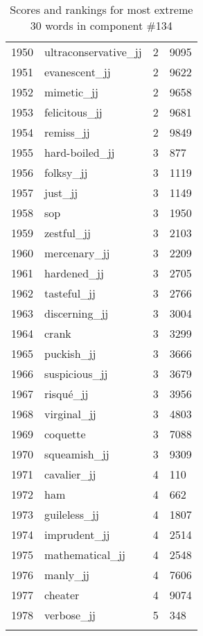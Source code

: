 \begin{longtable}[!htbp]{| rlr@{.}l |}
    1950 & ultraconservative\_jj & 2 & 9095 \\
    1951 & evanescent\_jj & 2 & 9622 \\
    1952 & mimetic\_jj & 2 & 9658 \\
    1953 & felicitous\_jj & 2 & 9681 \\
    1954 & remiss\_jj & 2 & 9849 \\
    1955 & hard-boiled\_jj & 3 & 877 \\
    1956 & folksy\_jj & 3 & 1119 \\
    1957 & just\_jj & 3 & 1149 \\
    1958 & sop & 3 & 1950 \\
    1959 & zestful\_jj & 3 & 2103 \\
    1960 & mercenary\_jj & 3 & 2209 \\
    1961 & hardened\_jj & 3 & 2705 \\
    1962 & tasteful\_jj & 3 & 2766 \\
    1963 & discerning\_jj & 3 & 3004 \\
    1964 & crank & 3 & 3299 \\
    1965 & puckish\_jj & 3 & 3666 \\
    1966 & suspicious\_jj & 3 & 3679 \\
    1967 & risqué\_jj & 3 & 3956 \\
    1968 & virginal\_jj & 3 & 4803 \\
    1969 & coquette & 3 & 7088 \\
    1970 & squeamish\_jj & 3 & 9309 \\
    1971 & cavalier\_jj & 4 & 110 \\
    1972 & ham & 4 & 662 \\
    1973 & guileless\_jj & 4 & 1807 \\
    1974 & imprudent\_jj & 4 & 2514 \\
    1975 & mathematical\_jj & 4 & 2548 \\
    1976 & manly\_jj & 4 & 7606 \\
    1977 & cheater & 4 & 9074 \\
    1978 & verbose\_jj & 5 & 348 \\
    \hline
    \caption{Scores and rankings for most extreme 30 words in component \#134} \\
\end{longtable}
